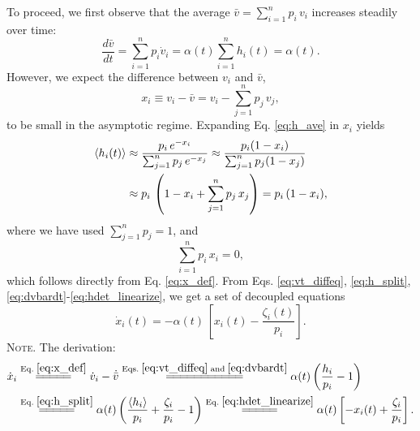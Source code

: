 \documentclass[reprint, floatfix]{revtex4-1}
\newcommand{\note}[1]{{\color{DarkGreen}\footnotesize \textsc{Note.} #1}}
\begin{document}
To proceed, we first observe that
the average $\bar v = \sum_{i = 1}^n p_i \, v_i$
increases steadily over time:
%
\begin{equation}
\frac{ d \bar v } { d t }
=
\sum_{i = 1}^n p_i \dot v_i
=
\alpha(t) \sum_{i = 1}^n h_i(t) = \alpha(t).
\label{eq:dvbardt}
\end{equation}
%
However, we expect the difference between $v_i$ and $\bar v$,
%
\begin{equation}
  x_i \equiv v_i - \bar v = v_i - \sum_{j = 1}^n p_j \, v_j,
  \label{eq:x_def}
\end{equation}
%
to be small in the asymptotic regime.
Expanding Eq. \eqref{eq:h_ave} in $x_i$ yields
%
\begin{align}
\langle h_i(t) \rangle
&\approx
\frac{                 p_i \, e^{- x_i} }
     { \sum_{ j = 1}^n p_j \, e^{- x_j} }
\approx
\frac{                 p_i (1 - x_i) }
     { \sum_{ j = 1}^n p_j (1 - x_j) }
\notag
\\
&\approx
p_i \, \left(
         1 - x_i + \sum_{j=1}^n p_j \, x_j
       \right)
=
p_i \, (1 - x_i),
\label{eq:hdet_linearize}
\end{align}
%
where we have used $\sum_{j=1}^n p_j = 1$,
and
%
\begin{equation}
  \sum_{i = 1}^n p_i \, x_i = 0,
  \label{eq:px_sum}
\end{equation}
which follows directly from Eq. \eqref{eq:x_def}.
%
From Eqs.
\eqref{eq:vt_diffeq},
\eqref{eq:h_split},
\eqref{eq:dvbardt}-\eqref{eq:hdet_linearize},
we get a set of decoupled equations
%
\begin{equation}
  \dot x_i(t)
  =
  -\alpha(t) \, \left[ x_i(t) - \frac{ \zeta_i(t) } { p_i } \right].
  \label{eq:dxdt_WL}
\end{equation}
\note{The derivation:
$$
\begin{aligned}
  \dot x_i
  &\stackrel{\mathrm{Eq.\; \eqref{eq:x_def}}}
            {=\joinrel=\joinrel=\joinrel=\joinrel=}
  \dot v_i - \dot{ \bar v }
  \stackrel{\mathrm{Eqs.\; \eqref{eq:vt_diffeq}\; and\; \eqref{eq:dvbardt}}}
            {=\joinrel=\joinrel=\joinrel=\joinrel=\joinrel=\joinrel=\joinrel=\joinrel=\joinrel=\joinrel=}
  \alpha(t) \left( \frac{ h_i } { p_i } - 1 \right)
  \\
  &\stackrel{\mathrm{Eq.\; \eqref{eq:h_split}}}
            {=\joinrel=\joinrel=\joinrel=\joinrel=}
  \alpha(t) \left( \frac{ \langle h_i \rangle } { p_i } + \frac{ \zeta_i } { p_i } - 1 \right)
  \stackrel{\mathrm{Eq.\; \eqref{eq:hdet_linearize}}}
            {=\joinrel=\joinrel=\joinrel=\joinrel=}
  \alpha(t) \left[ -x_i(t) + \frac{ \zeta_i } { p_i } \right].
\end{aligned}
$$
}
\end{document}
